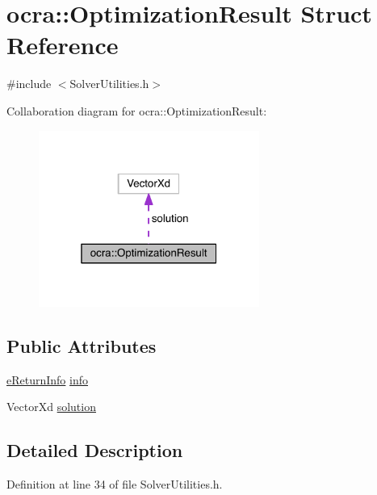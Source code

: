 \hypertarget{structocra_1_1OptimizationResult}{}\section{ocra\+:\+:Optimization\+Result Struct Reference}
\label{structocra_1_1OptimizationResult}


{\ttfamily \#include $<$Solver\+Utilities.\+h$>$}



Collaboration diagram for ocra\+:\+:Optimization\+Result\+:\nopagebreak
\begin{figure}[H]
\begin{center}
\leavevmode
\includegraphics[width=205pt]{d4/d27/structocra_1_1OptimizationResult__coll__graph}
\end{center}
\end{figure}
\subsection*{Public Attributes}
\begin{DoxyCompactItemize}
\item 
\hyperlink{namespaceocra_aa1d873ac30cb0a0f79ba978745de294b}{e\+Return\+Info} \hyperlink{structocra_1_1OptimizationResult_ab422e9cee7b8996585676d61ca14499b}{info}
\item 
Vector\+Xd \hyperlink{structocra_1_1OptimizationResult_a5d0f76e8b3e5d517ba83a2ecd082f85b}{solution}
\end{DoxyCompactItemize}


\subsection{Detailed Description}


Definition at line 34 of file Solver\+Utilities.\+h.




